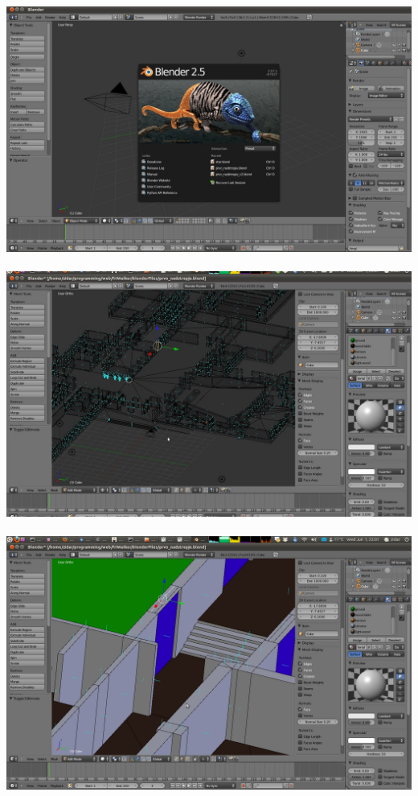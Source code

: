 \documentclass[10pt,a4paper]{article}
\begin{document}
\ \\
\includegraphics[scale=0.3]{Screenshot.jpg}\\ 
\ \\
\includegraphics[scale=0.3]{Screenshot2.jpg}\\ 
\ \\
\includegraphics[scale=0.3]{Screenshot-1.png}\\ 
\end{document}
